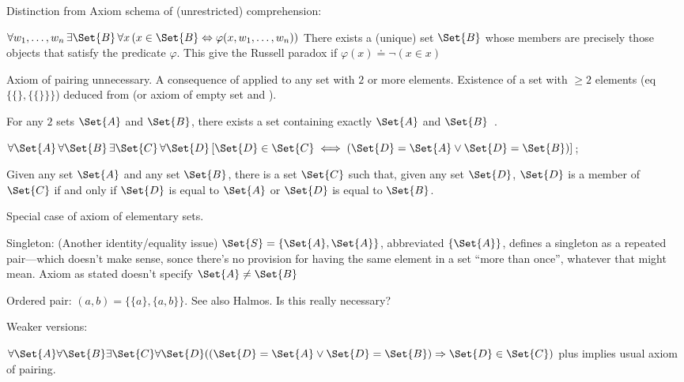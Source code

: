Distinction from Axiom schema of (unrestricted) comprehension:

$\forall w_1,\ldots,w_n \, \exists \Set{B} \, 
\forall x \, ( x \in \Set{B} 
\Leftrightarrow \varphi(x, w_1, \ldots, w_n) )$
There exists a (unique) set $\Set{B}$ 
whose members are precisely those objects 
that satisfy the predicate $\varphi$.
This give the Russell paradox if 
$\varphi(x) \doteq \neg(x \in x)$

\label{sec:Axiom-of-pairing}

Axiom of pairing unnecessary.
A consequence of 
applied to any set with $2$ or more elements.
Existence of a set with $\geq 2$ elements
(eq $\{ \{\}, \{ \{\} \} \}$)
deduced from 
(or axiom of empty set\cite{wiki:Axiom_of_empty_set}
and ).

For any $2$ sets $\Set{A}$ and $\Set{B}$,
there exists a set containing exactly $\Set{A}$ and 
$\Set{B}$~\cite{wiki:Axiom_of_pairing}.

$\forall \Set{A}\,\forall \Set{B}\,\exists \Set{C}\,\forall \Set{D}\,
[\Set{D}\in \Set{C}\iff (\Set{D}=\Set{A}\lor \Set{D}=\Set{B})]$;

Given any set $\Set{A}$ and any set $\Set{B}$, 
there is a set $\Set{C}$ such that, 
given any set $\Set{D}$, 
$\Set{D}$ is a member of $\Set{C}$ 
if and only if 
$\Set{D}$ is equal to $\Set{A}$ 
or 
$\Set{D}$ is equal to $\Set{B}$.

Special case of axiom of elementary 
sets\cite{wiki:Zermelo_set_theory}.

Singleton:
(Another identity/equality issue)
$\Set{S}=\{\Set{A},\Set{A}\}$, abbreviated $\{\Set{A}\}$,
defines a singleton as a repeated pair---which doesn't make sense,
sonce there's no provision for having the same element
in a set ``more than once'', whatever that might mean.
Axiom as stated doesn't specify $\Set{A} \neq \Set{B}$

Ordered pair:
$(a,b)=\{\{a\},\{a,b\}\}$.
See also Halmos\cite{Halmos1960Naive}.
Is this really necessary? 

Weaker versions:
 
${\displaystyle 
\forall \Set{A} \forall \Set{B} 
\exists \Set{C}
\forall \Set{D}((\Set{D}=\Set{A}\lor \Set{D}=\Set{B}) \Rightarrow \Set{D}\in \Set{C})}$
plus 
implies usual axiom of pairing.

